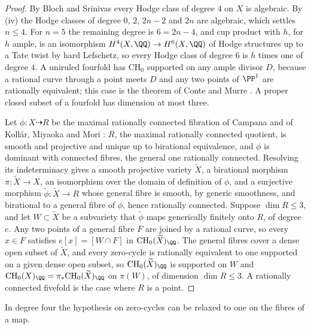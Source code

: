 \begin{proof}
By Bloch and Srinivas \cite{BS83} every Hodge class of degree $4$ on $X$ is
algebraic. By (iv) the Hodge classes of degree $0$, $2$,
$2n-2$ and $2n$ are algebraic, which settles $n\le4$. For $n=5$ the remaining
degree is $6=2n-4$, and cup product with $h$, for $h$ ample, is an isomorphism
$H^{4}(X,\QQ)\to H^{6}(X,\QQ)$ of Hodge structures up to a Tate twist by hard
Lefschetz, so every Hodge class of degree $6$ is $h$ times one of degree $4$.
A uniruled fourfold has $\mathrm{CH}_{0}$ supported on any ample divisor $D$,
because a rational curve through a point meets $D$ and any two points of
$\PP^{1}$ are rationally equivalent; this case is the theorem of Conte and
Murre \cite{CM78}. A proper closed subset of a fourfold has dimension at
most three.

Let $\phi\colon X\dashrightarrow R$ be the maximal rationally connected
fibration of Campana and of Koll\'ar, Miyaoka and Mori \cite{Cam92,KMM92}:
$R$, the maximal rationally connected quotient, is smooth and projective and
unique up to birational equivalence, and $\phi$ is dominant with connected
fibres, the general one rationally connected. Resolving its indeterminacy
\cite{Hir64} gives a smooth projective variety $\widetilde X$, a birational
morphism $\pi\colon\widetilde X\to X$, an isomorphism over the domain of
definition of $\phi$, and a surjective
morphism $\widetilde\phi\colon\widetilde X\to R$ whose general fibre is
smooth, by generic smoothness, and birational to a general fibre of $\phi$,
hence rationally connected. Suppose $\dim R\le3$, and let
$W\subset\widetilde X$ be a subvariety that $\widetilde\phi$ maps generically
finitely onto $R$, of degree $e$. Any two points of a general fibre $F$ are
joined by a rational curve, so every $x\in F$ satisfies $e[x]=[W\cap F]$ in
$\mathrm{CH}_{0}(\widetilde X)_{\QQ}$. The general fibres cover a dense open
subset of $\widetilde X$, and every zero-cycle is rationally equivalent to
one supported on a given dense open subset, so
$\mathrm{CH}_{0}(\widetilde X)_{\QQ}$ is supported on $W$ and
$\mathrm{CH}_{0}(X)_{\QQ}=\pi_{*}\mathrm{CH}_{0}(\widetilde X)_{\QQ}$ on
$\pi(W)$, of dimension $\dim R\le3$. A rationally connected fivefold is the
case where $R$ is a point.
\end{proof}

In degree four the hypothesis on zero-cycles can be relaxed to one on the
fibres of a map.

